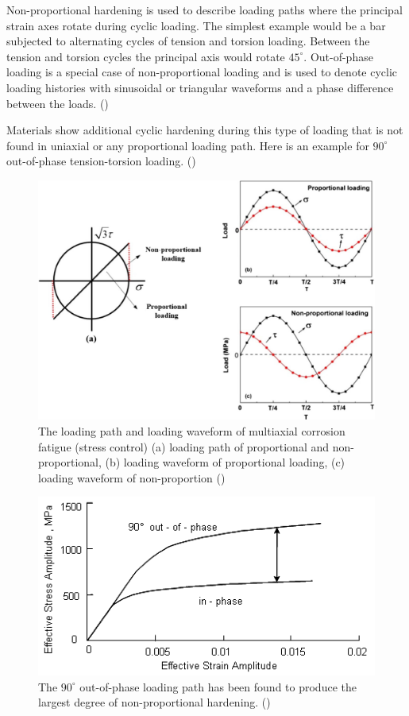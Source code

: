 Non-proportional hardening is used to describe loading paths where the principal strain axes rotate during cyclic loading. The simplest example would be a bar subjected to alternating cycles of tension and torsion loading. Between the tension and torsion cycles the principal axis would rotate $45^\circ$. Out-of-phase loading is a special case of non-proportional loading and is used to denote cyclic loading histories with sinusoidal or triangular waveforms and a phase difference between the loads. (\cite{EFATIGUE})

Materials show additional cyclic hardening during this type of loading that is not found in uniaxial or any proportional loading path. Here is an example for $90^\circ$ out-of-phase tension-torsion loading. ()

\begin{figure}[!h]
	\centering
	\includegraphics[width=\textwidth]{figures//outofphase.jpg} 
	\caption{The loading path and loading waveform of multiaxial corrosion fatigue (stress control) (a) loading path of proportional and non-proportional, (b) loading waveform of proportional loading, (c) loading waveform of non-proportion (\cite{HUANG2017259})}
	\label{fig.outofphase}
\end{figure}

\begin{figure}[!h]
	\centering
	\includegraphics[width=\textwidth]{figures//outofphasestress.png} 
	\caption{The $90^\circ$ out-of-phase loading path has been found to produce the largest degree of non-proportional hardening. (\cite{EFATIGUE})}
	\label{fig.outofphasestress}
\end{figure}

